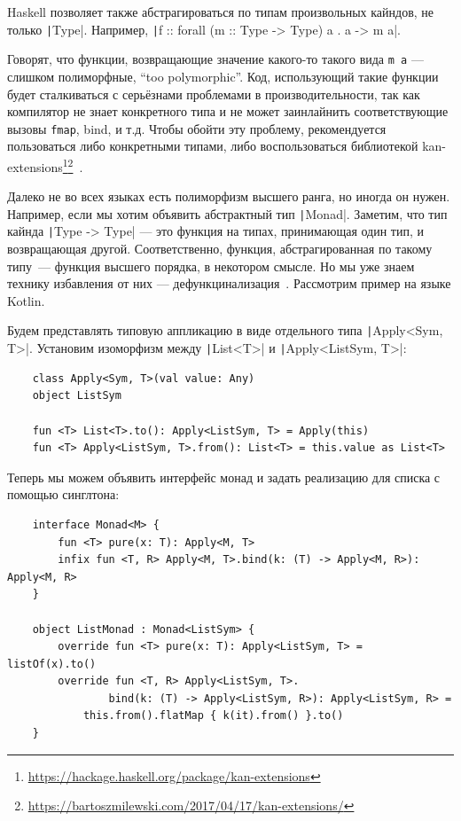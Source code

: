 Haskell позволяет также абстрагироваться по типам произвольных кайндов, не только \texttt|Type|.
Например, \texttt|f :: forall (m :: Type -> Type) a . a -> m a|.


Говорят, что функции, возвращающие значение какого-то такого вида \texttt{m a} --- слишком полиморфные, ``too polymorphic''.
Код, использующий такие функции будет сталкиваться с серьёзнами проблемами в производительности, так как компилятор не знает конкретного типа и не может заинлайнить соответствующие вызовы \texttt{fmap}, bind, и т.д.
Чтобы обойти эту проблему, рекомендуется пользоваться либо конкретными типами, либо воспользоваться библиотекой kan-extensions\footnote{\url{https://hackage.haskell.org/package/kan-extensions}}\footnote{\url{https://bartoszmilewski.com/2017/04/17/kan-extensions/}}~\cite[параграф 13.5]{maguire-types}.

Далеко не во всех языках есть полиморфизм высшего ранга, но иногда он нужен.
Например, если мы хотим объявить абстрактный тип \texttt|Monad|.
Заметим, что тип кайнда \texttt|Type -> Type| --- это функция на типах, принимающая один тип, и возвращающая другой.
Соответственно, функция, абстрагированная по такому типу~--- функция высшего порядка, в некотором смысле.
Но мы уже знаем технику избавления от них --- дефункцинализация~\cite{defunctionalization-slides}.
Рассмотрим пример на языке Kotlin.

Будем представлять типовую аппликацию в виде отдельного типа \texttt|Apply<Sym, T>|.
Установим изоморфизм между \texttt|List<T>| и \texttt|Apply<ListSym, T>|:
\begin{verbatim}
    class Apply<Sym, T>(val value: Any)
    object ListSym

    fun <T> List<T>.to(): Apply<ListSym, T> = Apply(this)
    fun <T> Apply<ListSym, T>.from(): List<T> = this.value as List<T>
\end{verbatim}

Теперь мы можем объявить интерфейс монад и задать реализацию для списка с помощью синглтона:
\begin{verbatim}
    interface Monad<M> {
        fun <T> pure(x: T): Apply<M, T>
        infix fun <T, R> Apply<M, T>.bind(k: (T) -> Apply<M, R>): Apply<M, R>
    }

    object ListMonad : Monad<ListSym> {
        override fun <T> pure(x: T): Apply<ListSym, T> = listOf(x).to()
        override fun <T, R> Apply<ListSym, T>.
                bind(k: (T) -> Apply<ListSym, R>): Apply<ListSym, R> =
            this.from().flatMap { k(it).from() }.to()
    }
\end{verbatim}

